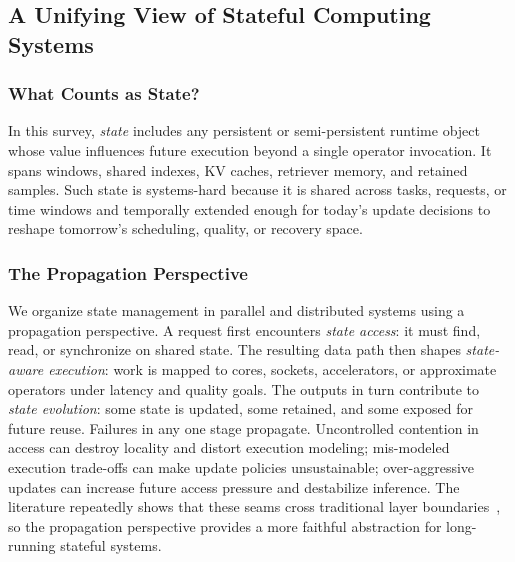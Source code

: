 ﻿\documentclass[manuscript]{acmart}
\newcommand{\sysproblem}{state management in parallel and distributed systems\xspace}
\begin{document}
\subsection{A Unifying View of Stateful Computing Systems}

\subsubsection{What Counts as State?}

In this survey, \emph{state} includes any persistent or semi-persistent runtime object whose value influences future execution beyond a single operator invocation. It spans windows, shared indexes, KV caches, retriever memory, and retained samples. Such state is systems-hard because it is shared across tasks, requests, or time windows and temporally extended enough for today's update decisions to reshape tomorrow's scheduling, quality, or recovery space.

\subsubsection{The Propagation Perspective}

We organize \sysproblem using a propagation perspective. A request first encounters \emph{state access}: it must find, read, or synchronize on shared state. The resulting data path then shapes \emph{state-aware execution}: work is mapped to cores, sockets, accelerators, or approximate operators under latency and quality goals. The outputs in turn contribute to \emph{state evolution}: some state is updated, some retained, and some exposed for future reuse. Failures in any one stage propagate. Uncontrolled contention in access can destroy locality and distort execution modeling; mis-modeled execution trade-offs can make update policies unsustainable; over-aggressive updates can increase future access pressure and destabilize inference. The literature repeatedly shows that these seams cross traditional layer boundaries~\cite{zhang2019briskstream,zhang2020concurrent,zeng2024pecj,zhou2025ferret,li2026streamfp,zhang2026flowrag}, so the propagation perspective provides a more faithful abstraction for long-running stateful systems.
\end{document}
